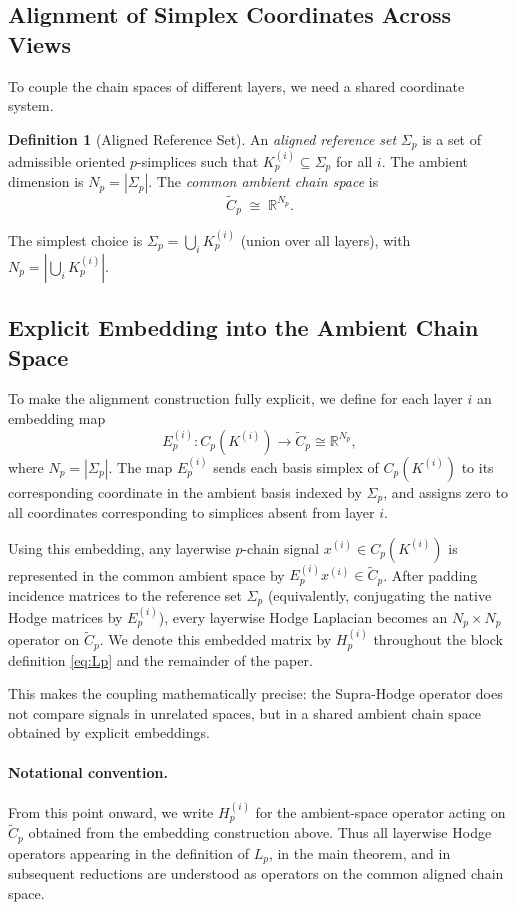 \documentclass[11pt]{article}
\theoremstyle{definition}
\newtheorem{definition}[theorem]{Definition}
\theoremstyle{remark}
\newcommand{\R}{\mathbb{R}}
\newcommand{\Ctil}{\widetilde{C}}
\begin{document}
\subsection{Alignment of Simplex Coordinates Across Views}

To couple the chain spaces of different layers, we need a shared coordinate
system.

\begin{definition}[Aligned Reference Set]
An \emph{aligned reference set} $\Sigma_p$ is a set of admissible oriented
$p$-simplices such that $K_p^{(i)}\subseteq\Sigma_p$ for all $i$. The ambient
dimension is $N_p = |\Sigma_p|$. The \emph{common ambient chain space} is
\[
  \Ctil_p \;\cong\; \R^{N_p}.
\]
\end{definition}

The simplest choice is $\Sigma_p = \bigcup_i K_p^{(i)}$ (union over all
layers), with $N_p = |\bigcup_i K_p^{(i)}|$.

\subsection{Explicit Embedding into the Ambient Chain Space}

To make the alignment construction fully explicit, we define for each layer $i$ an embedding map
\[
E_p^{(i)} : C_p\!\left(K^{(i)}\right) \longrightarrow \Ctil_p \cong \R^{N_p},
\]
where $N_p = |\Sigma_p|$. The map $E_p^{(i)}$ sends each basis simplex of $C_p(K^{(i)})$
to its corresponding coordinate in the ambient basis indexed by $\Sigma_p$, and assigns zero to all coordinates corresponding to simplices absent from layer $i$.

Using this embedding, any layerwise $p$-chain signal $x^{(i)} \in C_p(K^{(i)})$ is represented in the common ambient space by $E_p^{(i)}x^{(i)} \in \Ctil_p$. After padding incidence matrices to the reference set $\Sigma_p$ (equivalently, conjugating the native Hodge matrices by $E_p^{(i)}$), every layerwise Hodge Laplacian becomes an $N_p\times N_p$ operator on $\Ctil_p$. We denote this embedded matrix by $H_p^{(i)}$ throughout the block definition \eqref{eq:Lp} and the remainder of the paper.

This makes the coupling mathematically precise: the Supra-Hodge operator does not compare signals in unrelated spaces, but in a shared ambient chain space obtained by explicit embeddings.

\paragraph{Notational convention.}
From this point onward, we write $H_p^{(i)}$ for the ambient-space operator acting on $\Ctil_p$ obtained from the embedding construction above. Thus all layerwise Hodge operators appearing in the definition of $L_p$, in the main theorem, and in subsequent reductions are understood as operators on the common aligned chain space.
\end{document}
